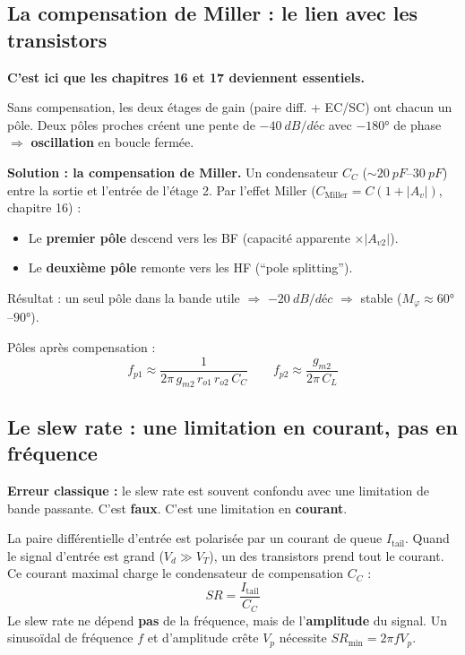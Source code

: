 \documentclass[12pt,a4paper,twoside]{book}
\begin{document}
\subsection{La compensation de Miller : le lien avec les transistors}

\begin{attention}
\textbf{C'est ici que les chapitres 16 et 17 deviennent essentiels.}

Sans compensation, les deux étages de gain (paire diff. + EC/SC) ont chacun un pôle. Deux pôles proches créent une pente de $-\SI{40}{dB/déc}$ avec $-180°$ de phase $\Rightarrow$ \textbf{oscillation} en boucle fermée.

\textbf{Solution : la compensation de Miller.} Un condensateur $C_C$ ($\sim\SI{20}{pF}$--$\SI{30}{pF}$) entre la sortie et l'entrée de l'étage 2. Par l'effet Miller ($C_{\text{Miller}} = C(1+|A_v|)$, chapitre 16) :
\begin{itemize}[nosep]
\item Le \textbf{premier pôle} descend vers les BF (capacité apparente $\times |A_{v2}|$).
\item Le \textbf{deuxième pôle} remonte vers les HF (``pole splitting'').
\end{itemize}
Résultat : un seul pôle dans la bande utile $\Rightarrow$ $-\SI{20}{dB/déc}$ $\Rightarrow$ stable ($M_\varphi \approx 60°$--$90°$).
\end{attention}

\begin{formule}
Pôles après compensation :
\[
f_{p1} \approx \frac{1}{2\pi\,g_{m2}\,r_{o1}\,r_{o2}\,C_C} \qquad f_{p2} \approx \frac{g_{m2}}{2\pi\,C_L}
\]
\end{formule}

\subsection{Le slew rate : une limitation en courant, pas en fréquence}

\begin{attention}
\textbf{Erreur classique :} le slew rate est souvent confondu avec une limitation de bande passante. C'est \textbf{faux}. C'est une limitation en \textbf{courant}.
\end{attention}

\begin{formule}
La paire différentielle d'entrée est polarisée par un courant de queue $I_{\text{tail}}$. Quand le signal d'entrée est grand ($V_d \gg V_T$), un des transistors prend tout le courant. Ce courant maximal charge le condensateur de compensation $C_C$ :
\[
\boxed{SR = \frac{I_{\text{tail}}}{C_C}}
\]
Le slew rate ne dépend \textbf{pas} de la fréquence, mais de l'\textbf{amplitude} du signal. Un sinusoïdal de fréquence $f$ et d'amplitude crête $V_p$ nécessite $SR_{\min} = 2\pi f V_p$.
\end{formule}
\end{document}
